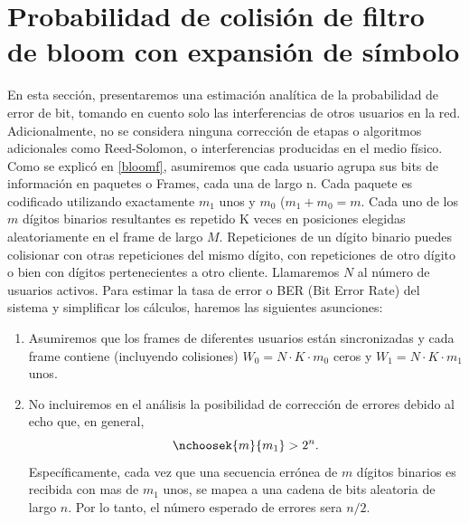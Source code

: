 \section{Probabilidad de colisión de filtro de bloom con expansión de símbolo}

En esta sección, presentaremos una estimación analítica de la probabilidad de error de bit, tomando en cuento solo las interferencias de otros usuarios en la red.
Adicionalmente, no se considera ninguna corrección de etapas o algoritmos adicionales como Reed-Solomon, o interferencias producidas en el medio físico.
Como se explicó en \ref{bloomf}, asumiremos que cada usuario agrupa sus bits de información en paquetes o Frames, cada una de largo n. Cada paquete es codificado utilizando exactamente $m_{1}$ unos y $m_{0}$ ($m_{1}+m_{0}=m$. Cada uno de los $m$ dígitos binarios resultantes es repetido K veces en posiciones elegidas aleatoriamente en el frame de largo $M$. Repeticiones de un dígito binario puedes colisionar con otras repeticiones del mismo dígito, con repeticiones de otro dígito o bien con dígitos pertenecientes a otro cliente.
Llamaremos $N$ al número de usuarios activos. Para estimar la tasa de error o BER (Bit Error Rate) del sistema y simplificar los cálculos, haremos las siguientes asunciones:

\begin{enumerate}
 \item Asumiremos que los frames de diferentes usuarios están sincronizadas y cada frame contiene (incluyendo colisiones) $W_0 = N\cdot K\cdot m_0$ ceros y $W_1 = N\cdot K\cdot m_1$ unos.
 \item No incluiremos en el análisis la posibilidad de corrección de errores debido al echo que, en general, 
 \begin{equation}
\nchoosek{m}{m_1} > 2^n.
\end{equation}
Específicamente, cada vez que una secuencia errónea de $m$ dígitos binarios es recibida con mas de $m_1$ unos, se mapea a una cadena de bits aleatoria de largo $n$.
Por lo tanto, el número esperado de errores sera $n/2$.
\end{enumerate}

